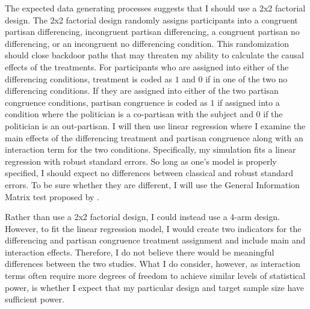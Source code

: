 \documentclass[12pt]{article}
\begin{document}
The expected data generating processes suggests that I should use a 2x2 factorial design. The 2x2 factorial design randomly assigns participants into a congruent partisan differencing, incongruent partisan differencing, a congruent partisan no differencing, or an incongruent no differencing condition. This randomization should close backdoor paths that may threaten my ability to calculate the causal effects of the treatments. For participants who are assigned into either of the differencing conditions, $\text{treatment}$ is coded as $1$ and $0$ if in one of the two no differencing conditions. If they are assigned into either of the two partisan congruence conditions, $\text{partisan congruence}$ is coded as $1$ if assigned into a condition where the politician is a co-partisan with the subject and $0$ if the politician is an out-partisan. I will then use linear regression where I examine the main effects of the differencing treatment and partisan congruence along with an interaction term for the two conditions. Specifically, my simulation fits a linear regression with robust standard errors. So long as one's model is properly specified, I should expect no differences between classical and robust standard errors. To be sure whether they are different, I will use the General Information Matrix test proposed by \citet{king_roberts_2015_pa}. 

Rather than use a 2x2 factorial design, I could instead use a 4-arm design. However, to fit the linear regression model, I would create two indicators for the differencing and partisan congruence treatment assignment and include main and interaction effects. Therefore, I do not believe there would be meaningful differences between the two studies. What I do consider, however, as interaction terms often require more degrees of freedom to achieve similar levels of statistical power, is whether I expect that my particular design and target sample size have sufficient power.
\end{document}
